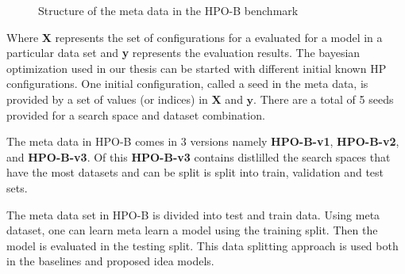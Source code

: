 \documentclass[12pt, twoside, ngerman]{report}
\begin{document}
\begin{figure}[htb]
\centering
{}
\caption{Structure of the meta data in the HPO-B benchmark}
\label{fig:metadataorganization}
\end{figure}
Where \textbf{X} represents the set of configurations for a evaluated for a model in a particular data set and
\textbf{y} represents the evaluation results.
The bayesian optimization used in our thesis can be started with different initial known HP configurations.
One initial configuration, called a seed in the meta data, is provided by a set of values (or indices) in $\textbf{X}$ and $\textbf{y}$.
There are a total of 5 seeds provided for a search space and dataset combination.

The meta data in HPO-B comes in 3 versions namely \textbf{HPO-B-v1},  \textbf{HPO-B-v2}, and \textbf{HPO-B-v3}.
Of this \textbf{HPO-B-v3} contains distlilled the search spaces that have the most datasets and can be split is split into train,  validation and test sets. 

The meta data set in HPO-B is divided into test and train data.
Using meta dataset,  one can learn meta learn a model using the training split.
Then the model is evaluated in the testing split.
This data splitting approach is used both in the baselines and proposed idea models.
\end{document}
